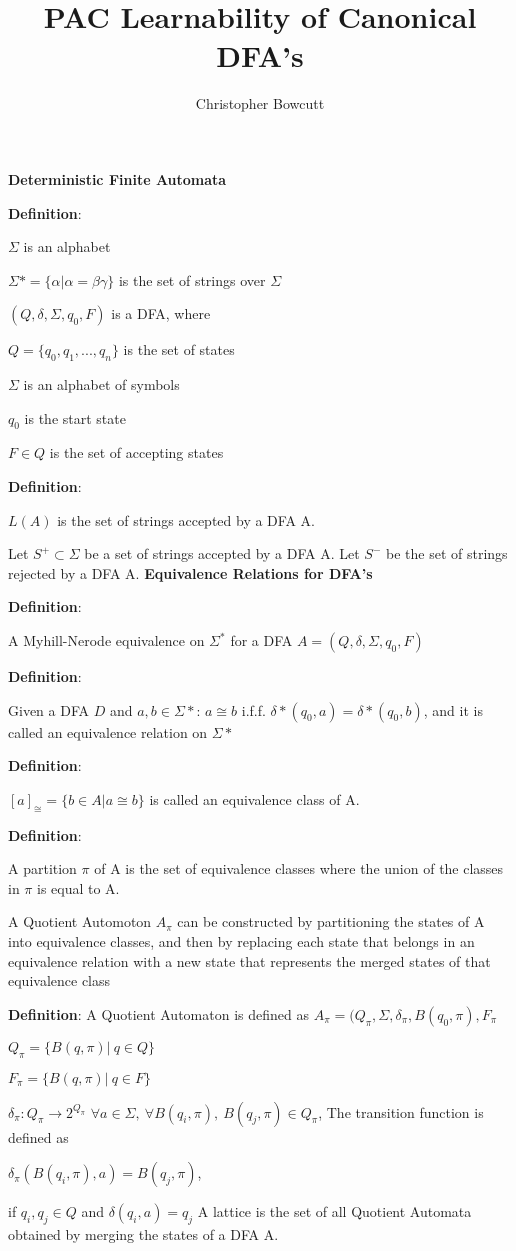 \documentclass[10pt,a4paper]{report}
\author{Christopher Bowcutt}
\title{PAC Learnability of Canonical DFA's}
\newcommand{\defineb}[1]{
	\textbf{Definition}:\indent
	#1
	\newline
}
\newcommand{\defnl}{
\newline\indent\indent\indent\indent\indent
}
\begin{document}
\noindent
\textbf{Deterministic Finite Automata}
\newline
\newline
\defineb{
\defnl $\Sigma$ is an alphabet 
\defnl $\Sigma* = \{ \alpha | \alpha = \beta \gamma \}$ is the set of strings over $\Sigma$ 
\defnl $(Q, \delta, \Sigma, q_0, F)$ is a DFA, where
\defnl \indent $Q = \{q_0, q_1, ... , q_n \} $ is the set of states
\defnl \indent $\Sigma$ is an alphabet of symbols
\defnl \indent $q_0$ is the start state
\defnl \indent $F \in Q$ is the set of accepting states
}
\newline
\defineb{
$L(A)$ is the set of strings accepted by a DFA A.
}
\newline Let $S^+ \subset \Sigma$ be a set of strings accepted by a DFA A.
\newline Let $S^-$ be the set of strings rejected by a DFA A.
\newpage
\textbf{Equivalence Relations for DFA's}
\newline
\newline
\defineb{
A Myhill-Nerode equivalence on $\Sigma^*$ for a DFA
$A = (Q, \delta, \Sigma, q_0, F)$
}
\defineb{
Given a DFA $D$ and $a, b \in \Sigma*$: $a \cong b$ i.f.f. $\delta*(q_0, a) = \delta*(q_0, b)$, and it is called an equivalence relation  on $\Sigma*$
}
\newline
\defineb{
$[a]_{\cong} = \{ b\in A | a \cong b \}$ is called an equivalence class of A.
}
\newline
\defineb{
A partition $\pi$ of A is the set of equivalence classes where the union of the classes in $\pi$ is equal to A.
}
\newline
A Quotient Automoton $A_\pi$ can be constructed by partitioning the states of A into equivalence classes, and then by replacing each state that belongs in an equivalence relation with a new state that represents the merged states of that equivalence class
\newline
\newline
\defineb{ A Quotient Automaton is defined as $A_\pi = (Q_\pi, \Sigma, \delta_\pi, B(q_0, \pi), F_\pi$
\defnl
$Q_\pi = \{ B(q, \pi) | \ q \in Q \}$
\defnl 
$F_\pi = \{ B(q, \pi) | \ q \in F \}$
\defnl
$\delta_\pi: Q_\pi \rightarrow 2^{Q_\pi}$
\newline
\newline
$\forall a \in \Sigma, \ \forall B(q_i, \pi), \ B(q_j, \pi) \in Q_\pi$, The transition function is defined as 
\newline
\defnl
$\delta_\pi(B(q_i, \pi), a) =  B(q_j, \pi)$,
\defnl \indent if $q_i, q_j \in Q$ and $\delta(q_i, a) = q_j$
\newline
A lattice is the set of all Quotient Automata obtained by merging the states of a DFA A.
}
\end{document}
